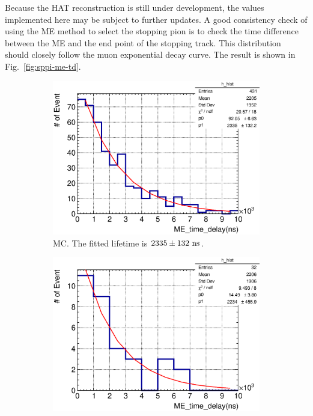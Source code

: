           Because the HAT reconstruction is still under development, the values implemented here may be subject to further updates.
          A good consistency check of using the ME method to select the stopping pion is to check the time difference between the ME and the end point of the stopping track.
          This distribution should closely follow the muon exponential decay curve.
          The result is shown in Fig.~\ref{fig:sppi-me-td}.

          \begin{figure}
               \centering
               \begin{subfigure}{\dbfigwid\textwidth}
                    \includegraphics[width=\textwidth]{figures/sel/sspi_TOP_ME_td_hist_al6_sfgfinposfit_comb.eps}
                    \caption{MC. The fitted lifetime is $2335\pm132~\textrm{ns}$.}
                    \label{subfig:sppi-me-td-mc}
               \end{subfigure}
               \begin{subfigure}{\dbfigwid\textwidth}
                    \includegraphics[width=\textwidth]{figures/sel/sspi_TOP_ME_td_hist_al6_sfgfinpos_fit.eps}

\end{subfigure}
\end{figure}
